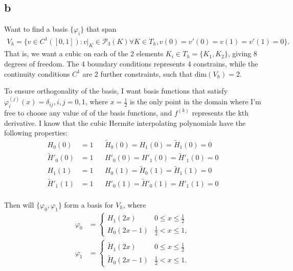 \documentclass[aps, 12pt]{revtex4}
\begin{document}
\subsection*{b}
Want to find a basis $\{\varphi_i\}$ that span
\begin{align*}
    V_h = \{v\in C^1([0,1]): v\vert_K\in\mathcal{P}_3(K)\forall K\in T_h, v(0)=v'(0)=v(1)=v'(1)=0\}.
\end{align*}
That is, we want a cubic on each of the 2 elements $K_i\in T_h = \{K_1, K_2\}$, giving 8 degrees of freedom. The 4 boundary conditions represents 4 constrains, while the continuity conditions $C^1$ are 2 further constraints, such that $\text{dim}(V_h)=2$.

To ensure orthogonality of the basis, I want basis functions that satisfy $\varphi_i^{(j)}(x)= \delta_{ij}, i,j=0, 1$, where $x=\frac{1}{2}$ is the only point in the domain where I'm free to choose any value of of the basis functions, and $f^{(k)}$ represents the kth derivative. I know that the cubic Hermite interpolating polynomials have the following properties:
\begin{align*}
    H_0(0)          & = 1 &  & \tilde{H}_0(0)=H_1(0)=\tilde{H}_1(0)=0 \\
    \tilde{H}'_0(0) & = 1 &  & H'_0(0)=H'_1(0)=\tilde{H}'_1(0)=0      \\
    H_1(1)          & = 1 &  & H_0(1)=\tilde{H}_0(1)=\tilde{H}_1(1)=0 \\
    \tilde{H}'_1(1) & = 1 &  & H'_0(1)=\tilde{H}'_0(1)=H'_1(1)=0      \\
\end{align*}

Then will $\{\varphi_0, \varphi_1\}$ form a basis for $V_h$, where
\begin{align*}
    \varphi_0 & =\begin{cases}
        H_1(2x)   & 0\leq x \leq \frac{1}{2}
        \\
        H_0(2x-1) & \frac{1}{2} < x \leq 1,
    \end{cases}
    \\
    \varphi_1 & =\begin{cases}
        \tilde{H}_1(2x)   & 0\leq x \leq \frac{1}{2}
        \\
        \tilde{H}_0(2x-1) & \frac{1}{2} < x \leq 1.
    \end{cases}
\end{align*}
\end{document}
